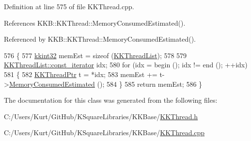 Definition at line 575 of file K\+K\+Thread.\+cpp.



References K\+K\+B\+::\+K\+K\+Thread\+::\+Memory\+Consumed\+Estimated().



Referenced by K\+K\+B\+::\+K\+K\+Thread\+::\+Memory\+Consumed\+Estimated().


\begin{DoxyCode}
576 \{
577   \hyperlink{namespace_k_k_b_a8fa4952cc84fda1de4bec1fbdd8d5b1b}{kkint32}  memEst = \textcolor{keyword}{sizeof} (\hyperlink{class_k_k_b_1_1_k_k_thread_list_a3e20a1118afaf9bb4257c4f7070aa954}{KKThreadList});
578 
579   \hyperlink{class_k_k_b_1_1_k_k_queue_aeb057c9c010446f46f57c1e355f981f1}{KKThreadList::const\_iterator}  idx;
580   \textcolor{keywordflow}{for}  (idx = begin ();  idx != end ();  ++idx)
581   \{
582     \hyperlink{class_k_k_b_1_1_k_k_thread}{KKThreadPtr}  t = *idx;
583     memEst += t->\hyperlink{class_k_k_b_1_1_k_k_thread_a0a8d08e9a902c496f7ee0c46f2aee2cc}{MemoryConsumedEstimated} ();
584   \}
585   \textcolor{keywordflow}{return}  memEst;
586 \}
\end{DoxyCode}


The documentation for this class was generated from the following files\+:\begin{DoxyCompactItemize}
\item 
C\+:/\+Users/\+Kurt/\+Git\+Hub/\+K\+Square\+Libraries/\+K\+K\+Base/\hyperlink{_k_k_thread_8h}{K\+K\+Thread.\+h}\item 
C\+:/\+Users/\+Kurt/\+Git\+Hub/\+K\+Square\+Libraries/\+K\+K\+Base/\hyperlink{_k_k_thread_8cpp}{K\+K\+Thread.\+cpp}\end{DoxyCompactItemize}
